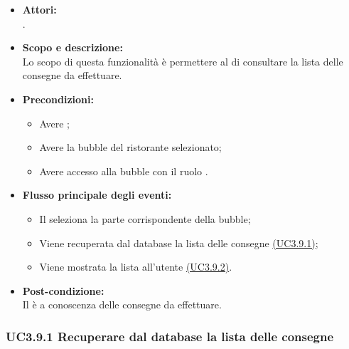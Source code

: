 \begin{itemize}
	\item \textbf{Attori:}
	\\.
	\item \textbf{Scopo e descrizione:} 
	\\Lo scopo di questa funzionalità è permettere al  di consultare la lista delle consegne da effettuare.
	\item \textbf{Precondizioni:}
	\begin{itemize}
		\item Avere ;
		\item Avere la bubble del ristorante selezionato;
		\item Avere accesso alla bubble con il ruolo .
	\end{itemize}
	\item \textbf{Flusso principale degli eventi:}
	\begin{itemize}
		\item Il  seleziona la parte corrispondente della bubble;
		\item Viene recuperata dal database la lista delle consegne \hyperref[UC3.9.1]{(UC3.9.1)};
		\item Viene mostrata la lista all’utente \hyperref[UC3.9.2]{(UC3.9.2)}.
	\end{itemize}
	\item \textbf{Post-condizione:}
	\\Il {} è a conoscenza delle consegne da effettuare.
\end{itemize}

\subsubsection{UC3.9.1 Recuperare dal database la lista delle consegne} \label{UC3.9.1}

